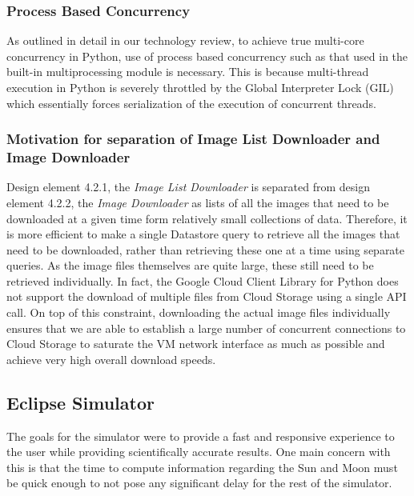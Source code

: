 \documentclass[10pt, onecolumn, draftclsnofoot, letterpaper, compsoc]{IEEEtran}
\begin{document}
    \subsubsection{Process Based Concurrency}
    As outlined in detail in our technology review, to achieve true multi-core concurrency in Python, use of
    process based concurrency such as that used in the built-in multiprocessing module is necessary. This is
    because multi-thread execution in Python is severely throttled by the Global Interpreter Lock (GIL) which
    essentially forces serialization of the execution of concurrent threads. \\

    \subsubsection{Motivation for separation of Image List Downloader and Image Downloader}
    Design element 4.2.1, the \textit{Image List Downloader} is separated from design element 4.2.2, the
    \textit{Image Downloader} as lists of all the images that need to be downloaded at a given time form
    relatively small collections of data. Therefore, it is more efficient to make a single Datastore query to
    retrieve all the images that need to be downloaded, rather than retrieving these one at a time using
    separate queries. As the image files themselves are quite large, these still need to be retrieved
    individually. In fact, the Google Cloud Client Library for Python does not support the download of multiple
    files from Cloud Storage using a single API call. On top of this constraint, downloading the actual image
    files individually ensures that we are able to establish a large number of concurrent connections to Cloud
    Storage to saturate the VM network interface as much as possible and achieve very high overall download
    speeds. \\

\subsection{Eclipse Simulator}


The goals for the simulator were to provide a fast and
responsive experience to the user while providing
scientifically accurate results. One main concern with this
is that the time to compute information regarding the Sun
and Moon must be quick enough to not pose any significant
delay for the rest of the simulator. \\
\end{document}
